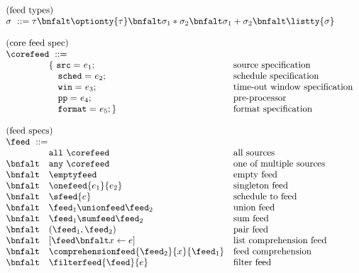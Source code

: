 \begin{figure}[t]
\[
\begin{array}{lll}
\multicolumn{3}{l}{\mbox{(feed types)}}\\ 
\multicolumn{3}{l}{\sigma \ ::= \tau \bnfalt \optionty{\tau} 
  \bnfalt \sigma_1 * \sigma_2
  \bnfalt \sigma_1 + \sigma_2
  \bnfalt \listty{\sigma}
}   \\  
\\
\multicolumn{3}{l}{\mbox{(core feed spec)}}\\ 
\multicolumn{3}{l}{\corefeed \ ::= }\\
& \{ \ \mathtt{src=}\    e_1;    & \mbox{source specification} \\
& \ \ \ \mathtt{sched=}\  e_2;    & \mbox{schedule specification}\\
& \ \ \ \mathtt{win=}\    e_3;    & \mbox{time-out window specification} \\
& \ \ \ \mathtt{pp=}\     e_4;    & \mbox{pre-processor} \\
& \ \ \ \mathtt{format=}\ e_5; \} & \mbox{format specification}\\ 
\\
\multicolumn{3}{l}{\mbox{(feed specs)}}\\ 
\multicolumn{3}{l}{\feed \ ::=}   \\  
         & \mathtt{all}\ \corefeed & \mbox{all sources}\\ 
 \bnfalt & \mathtt{any}\ \corefeed & \mbox{one of multiple sources}\\ 
 \bnfalt & \emptyfeed & \mbox{empty feed} \\
 \bnfalt & \onefeed{e_1}{e_2} & \mbox{singleton feed} \\
 \bnfalt & \sfeed{e} & \mbox{schedule to feed} \\
 \bnfalt & \feed_1 \unionfeed \feed_2 & \mbox{union feed} \\
 \bnfalt & \feed_1 \sumfeed \feed_2 & \mbox{sum feed} \\
 \bnfalt & (\feed_1, \feed_2) & \mbox{pair feed} \\
 \bnfalt & [\feed \bnfalt x \leftarrow e ] & \mbox{list comprehension feed} \\
 \bnfalt & \comprehensionfeed{\feed_2}{x}{\feed_1} & \mbox{feed comprehension} \\
 \bnfalt & \filterfeed{\feed}{e} & \mbox{filter feed} \\

\end{array}\]
\end{figure}
